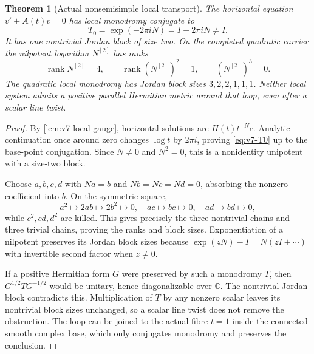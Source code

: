 \documentclass[11pt]{article}
\newtheorem{theorem}{Theorem}[section]
\theoremstyle{definition}
\theoremstyle{remark}
\newcommand{\C}{\mathbb C}
\newcommand{\rank}{\operatorname{rank}}
\begin{document}
\begin{theorem}[Actual nonsemisimple local transport]
\label{thm:v7-monodromy}
The horizontal equation $v'+A(t)v=0$ has local monodromy conjugate to
\begin{equation}
 \boxed{T_0=\exp(-2\pi iN)=I-2\pi iN\ne I.}
 \label{eq:v7-T0}
\end{equation}
It has one nontrivial Jordan block of size two. On the completed quadratic
carrier the nilpotent logarithm $N^{[2]}$ has ranks
\begin{equation}
 \boxed{\rank N^{[2]}=4,\qquad
        \rank (N^{[2]})^2=1,\qquad (N^{[2]})^3=0.}
 \label{eq:v7-N2-ranks}
\end{equation}
The quadratic local monodromy has Jordan block sizes
$3,2,2,1,1,1$. Neither local system admits a positive parallel Hermitian
metric around that loop, even after a scalar line twist.
\end{theorem}
\begin{proof}
By \cref{lem:v7-local-gauge}, horizontal solutions are
$H(t)t^{-N}c$. Analytic continuation once around zero changes $\log t$ by
$2\pi i$, proving \eqref{eq:v7-T0} up to the base-point conjugation. Since
$N\ne0$ and $N^2=0$, this is a nonidentity unipotent with a size-two block.

Choose $a,b,c,d$ with $Na=b$ and $Nb=Nc=Nd=0$, absorbing the nonzero
coefficient into $b$. On the symmetric square,
\[
 a^2\mapsto2ab\mapsto2b^2\mapsto0,\quad
 ac\mapsto bc\mapsto0,\quad ad\mapsto bd\mapsto0,
\]
while $c^2,cd,d^2$ are killed. This gives precisely the three nontrivial
chains and three trivial chains, proving the ranks and block sizes.
Exponentiation of a nilpotent preserves its Jordan block sizes because
$\exp(zN)-I=N(zI+\cdots)$ with invertible second factor when $z\ne0$.

If a positive Hermitian form $G$ were preserved by such a monodromy $T$, then
$G^{1/2}TG^{-1/2}$ would be unitary, hence diagonalizable over $\C$.
The nontrivial Jordan block contradicts this. Multiplication of $T$ by any
nonzero scalar leaves its nontrivial block sizes unchanged, so a scalar
line twist does not remove the obstruction. The loop can be joined to the
actual fibre $t=1$ inside the connected smooth complex base, which only
conjugates monodromy and preserves the conclusion.
\end{proof}
\end{document}
